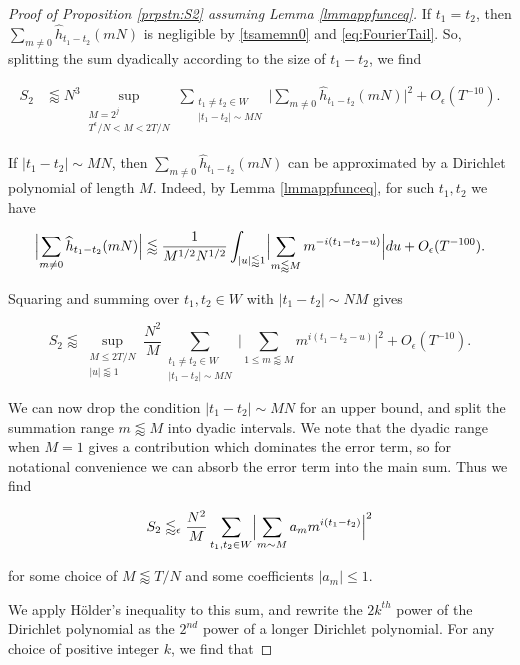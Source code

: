 \documentclass{amsart}
\theoremstyle{plain}
\numberwithin{equation}{section}
\begin{document}
\begin{proof}[Proof of Proposition \ref{prpstn:S2} assuming Lemma \ref{lmmappfunceq}]
If $t_1 = t_2$,  then $\sum_{m \not= 0} \widehat{h}_{t_1 - t_2}(mN)$ is negligible by \eqref{tsamemn0} and \eqref{eq:FourierTail}.   So, splitting the sum dyadically according to the size of $t_1-t_2$, we find

\begin{align*}
 S_2& \lessapprox N^3 \sup_{\substack{M=2^j\\ T^\epsilon/N<M<2T/N}}\sum_{\substack{t_1 \not= t_2 \in W\\ |t_1-t_2|\sim MN}} \Big| \sum_{m \not= 0} \widehat{h}_{t_1-t_2}(m N) \Big|^2 +O_\epsilon(T^{-10}).
 \end{align*}

If $|t_1 - t_2| \sim M N$,  then $\sum_{m \not= 0} \widehat{h}_{t_1 - t_2} (mN)$ can be approximated by a Dirichlet polynomial of length $M$.  Indeed, by Lemma \ref{lmmappfunceq}, for such $t_1,t_2$ we have

\[
 \Bigl| \sum_{m \not= 0} \widehat{h}_{t_1-t_2}(mN) \Bigr| \lessapprox \frac{1}{M^{1/2} N^{1/2}}\int_{|u|\lessapprox 1} \Bigl| \sum_{ m \lessapprox M}  m^{-i(t_1-t_2-u)} \Bigr|du + O_\epsilon( T^{-100} ). 
  \]
  
Squaring and summing over $t_1,t_2\in W$ with $|t_1-t_2|\sim NM$ gives

\[
 S_2 \lessapprox   \sup_{\substack{M\le 2T/N\\ |u|\lessapprox 1}}\frac{N^2}{M}\sum_{\substack{t_1 \not= t_2 \in W\\ |t_1-t_2|\sim MN}} \Big| \sum_{1\le m\lessapprox M}  m^{i(t_1-t_2-u)} \Big|^2 + O_\epsilon( T^{-10} ).
 \]

We can now drop the condition $|t_1-t_2|\sim MN$ for an upper bound, and split the summation range $m\lessapprox M$ into dyadic intervals. We note that the dyadic range when $M=1$ gives a contribution which dominates the error term, so for notational convenience we can absorb the error term into the main sum. Thus we find

\begin{equation}
S_2 \lessapprox_\epsilon \frac{N^2}{M}\sum_{t_1,t_2\in W}\Bigl|\sum_{m \sim M } a_m m^{i(t_1-t_2)}\Bigr|^2
\label{eq:S2Intermediate}
\end{equation}

for some choice of $M\lessapprox T/N$ and some coefficients $|a_m|\le 1$.

We apply H\"older's inequality to this sum, and rewrite the $2k^{th}$ power of the Dirichlet polynomial as the $2^{nd}$ power of a longer Dirichlet polynomial. For any choice of positive integer $k$, we find that


\end{proof}
\end{document}
